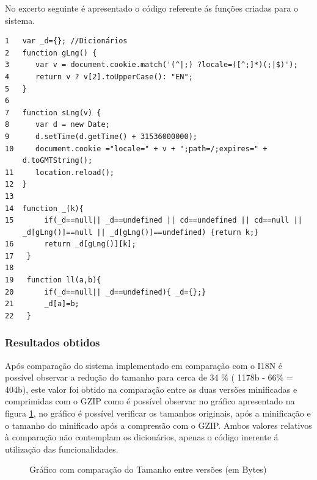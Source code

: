 \par No excerto seguinte é apresentado o código referente ás funções criadas para o sistema.
\begin{verbatim}
1   var _d={}; //Dicionários
2   function gLng() {
3      var v = document.cookie.match('(^|;) ?locale=([^;]*)(;|$)');
4      return v ? v[2].toUpperCase(): "EN";
5   }
6
7   function sLng(v) {
8      var d = new Date;
9      d.setTime(d.getTime() + 31536000000);
10     document.cookie ="locale=" + v + ";path=/;expires=" +
    d.toGMTString();
11     location.reload();
12  }
13
14  function _(k){
15       if(_d==null|| _d==undefined || cd==undefined || cd==null ||
    _d[gLng()]==null || _d[gLng()]==undefined) {return k;}
16       return _d[gLng()][k];
17   }
18
19   function ll(a,b){
20       if(_d==null|| _d==undefined){ _d={};}
21       _d[a]=b;
22   }

 \end{verbatim}

\subsubsection{Resultados obtidos}
\par Após comparação do sistema implementado em comparação com o I18N\cite{i18n} é possível observar a redução do tamanho  para cerca de 34 \% ( 1178b - 66\% = 404b), este valor foi obtido na comparação entre as duas versões minificadas e comprimidas com o GZIP como é possível observar no gráfico apresentado na figura \ref{garph1}, no gráfico é possível verificar os tamanhos originais, após a minificação e o tamanho do minificado após a compressão com o GZIP. Ambos valores relativos à comparação não contemplam os dicionários, apenas o código inerente á utilização das funcionalidades.

\begin{figure}[ht]
\centering
{}

\caption{Gráfico com comparação do Tamanho entre versões (em Bytes)}\label{garph1}
\end{figure}

